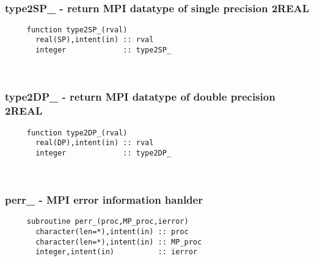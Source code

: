 
\mbox{}\hrulefill\ 
 
  \subsubsection{type2SP\_ - return MPI datatype of single precision 2REAL}

\begin{verbatim} 
     function type2SP_(rval)
       real(SP),intent(in) :: rval
       integer             :: type2SP_
 \end{verbatim}%
 
 
\mbox{}\hrulefill\ 
 
  \subsubsection{type2DP\_ - return MPI datatype of double precision 2REAL}

\begin{verbatim} 
     function type2DP_(rval)
       real(DP),intent(in) :: rval
       integer             :: type2DP_
 \end{verbatim}%
 
 
\mbox{}\hrulefill\ 
 
  \subsubsection{perr\_ - MPI error information hanlder}

\begin{verbatim} 
     subroutine perr_(proc,MP_proc,ierror)
       character(len=*),intent(in) :: proc
       character(len=*),intent(in) :: MP_proc
       integer,intent(in)          :: ierror
 \end{verbatim}%
 
